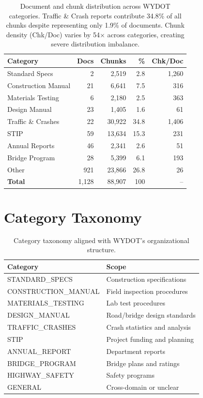 \documentclass{article}
\newcommand{\numDocs}{1{,}128}
\newcommand{\numChunks}{88{,}907}
\begin{document}
\begin{table}[H]
\centering
\footnotesize
\begin{tabular}{l r r r r}
\toprule
\textbf{Category} & \textbf{Docs} & \textbf{Chunks} & \textbf{\%} & \textbf{Chk/Doc} \\
\midrule
Standard Specs       & 2   & 2,519  & 2.8  & 1,260 \\
Construction Manual  & 21  & 6,641  & 7.5  & 316 \\
Materials Testing    & 6   & 2,180  & 2.5  & 363 \\
Design Manual        & 23  & 1,405  & 1.6  & 61 \\
Traffic \& Crashes   & 22  & 30,922 & 34.8 & 1,406 \\
STIP                 & 59  & 13,634 & 15.3 & 231 \\
Annual Reports       & 46  & 2,341  & 2.6  & 51 \\
Bridge Program       & 28  & 5,399  & 6.1  & 193 \\
Other                & 921 & 23,866 & 26.8 & 26 \\
\midrule
\textbf{Total} & \numDocs & \numChunks & 100 & -- \\
\bottomrule
\end{tabular}
\caption{Document and chunk distribution across WYDOT categories. Traffic \& Crash reports contribute 34.8\% of all chunks despite representing only 1.9\% of documents. Chunk density (Chk/Doc) varies by 54$\times$ across categories, creating severe distribution imbalance.}
\end{table}

\section{Category Taxonomy}
\label{app:categories}

\begin{table}[H]
\centering
\footnotesize
\begin{tabularx}{\columnwidth}{l X}
\toprule
\textbf{Category} & \textbf{Scope} \\
\midrule
STANDARD\_SPECS      & Construction specifications \\
CONSTRUCTION\_MANUAL & Field inspection procedures \\
MATERIALS\_TESTING   & Lab test procedures \\
DESIGN\_MANUAL       & Road/bridge design standards \\
TRAFFIC\_CRASHES     & Crash statistics and analysis \\
STIP                 & Project funding and planning \\
ANNUAL\_REPORT       & Department reports \\
BRIDGE\_PROGRAM      & Bridge plans and ratings \\
HIGHWAY\_SAFETY      & Safety programs \\
GENERAL              & Cross-domain or unclear \\
\bottomrule
\end{tabularx}
\caption{Category taxonomy aligned with WYDOT's organizational structure.}
\label{tab:categories}
\end{table}
\end{document}
